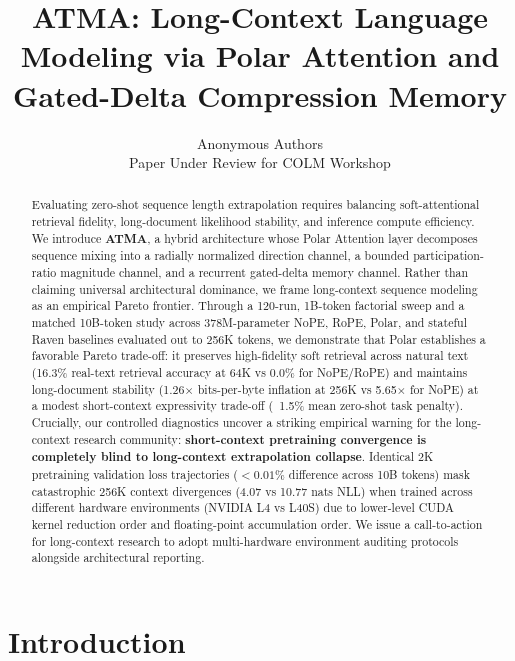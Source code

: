 \documentclass{article} %
\title{ATMA: Long-Context Language Modeling via Polar Attention and Gated-Delta Compression Memory}
\author{Anonymous Authors \\
Paper Under Review for COLM Workshop
}
\begin{document}
\ifcolmsubmission
\linenumbers
\fi

\maketitle

\begin{abstract}
Evaluating zero-shot sequence length extrapolation requires balancing soft-attentional retrieval fidelity, long-document likelihood stability, and inference compute efficiency. We introduce \textbf{ATMA}, a hybrid architecture whose Polar Attention layer decomposes sequence mixing into a radially normalized direction channel, a bounded participation-ratio magnitude channel, and a recurrent gated-delta memory channel. Rather than claiming universal architectural dominance, we frame long-context sequence modeling as an empirical Pareto frontier. Through a 120-run, 1B-token factorial sweep and a matched 10B-token study across 378M-parameter NoPE, RoPE, Polar, and stateful Raven baselines evaluated out to 256K tokens, we demonstrate that Polar establishes a favorable Pareto trade-off: it preserves high-fidelity soft retrieval across natural text (16.3\% real-text retrieval accuracy at 64K vs 0.0\% for NoPE/RoPE) and maintains long-document stability (1.26$\times$ bits-per-byte inflation at 256K vs 5.65$\times$ for NoPE) at a modest short-context expressivity trade-off (~1.5\% mean zero-shot task penalty). Crucially, our controlled diagnostics uncover a striking empirical warning for the long-context research community: \textbf{short-context pretraining convergence is completely blind to long-context extrapolation collapse}. Identical 2K pretraining validation loss trajectories ($<0.01\%$ difference across 10B tokens) mask catastrophic 256K context divergences (4.07 vs 10.77 nats NLL) when trained across different hardware environments (NVIDIA L4 vs L40S) due to lower-level CUDA kernel reduction order and floating-point accumulation order. We issue a call-to-action for long-context research to adopt multi-hardware environment auditing protocols alongside architectural reporting.
\end{abstract}

\section{Introduction}
\end{document}
